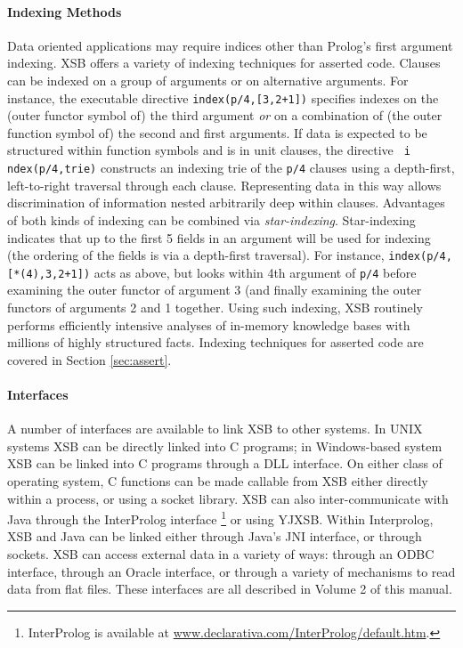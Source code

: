 \paragraph{Indexing Methods} Data oriented applications may
require indices other than Prolog's first argument indexing.  XSB
offers a variety of indexing techniques for asserted code.  Clauses
can be indexed on a group of arguments or on alternative arguments.
For instance, the executable directive {\tt index(p/4,[3,2+1])}
specifies indexes on the (outer functor symbol of) the third argument
{\em or} on a combination of (the outer function symbol of) the second
and first arguments.  If data is expected to be structured within
function symbols and is in unit clauses, the directive {\tt
  i ndex(p/4,trie)} constructs an indexing trie of the {\tt p/4}
clauses using a depth-first, left-to-right traversal through each
clause.  Representing data in this way allows discrimination of
information nested arbitrarily deep within clauses.  Advantages of
both kinds of indexing can be combined via {\em star-indexing}.
Star-indexing indicates that up to the first 5 fields in an argument
will be used for indexing (the ordering of the fields is via a
depth-first traversal).  For instance, {\tt index(p/4,[*(4),3,2+1])}
acts as above, but looks within 4th argument of {\tt p/4} before
examining the outer functor of argument 3 (and finally examining the
outer functors of arguments 2 and 1 together.  Using such indexing, XSB
routinely performs efficiently intensive analyses of in-memory
knowledge bases with millions of highly structured facts.  Indexing
techniques for asserted code are covered in Section \ref{sec:assert}.

 
\paragraph{Interfaces} A number of interfaces are available to link XSB
to other systems.  In UNIX systems XSB can be directly linked into C
programs; in Windows-based system XSB can be linked into C programs
through a DLL interface.  On either class of operating system, C
functions can be made callable from XSB either directly within a
process, or using a socket library.  XSB can also inter-communicate
with Java through the InterProlog interface \footnote{InterProlog is 
available at \url{www.declarativa.com/InterProlog/default.htm}.} or
using YJXSB.  Within Interprolog, XSB and Java can be linked either through
Java's JNI interface, or through sockets.  XSB can access external
data in a variety of ways: through an ODBC interface, through an
Oracle interface, or through a variety of mechanisms to read data from
flat files.  These interfaces are all described in Volume 2 of this
manual.

